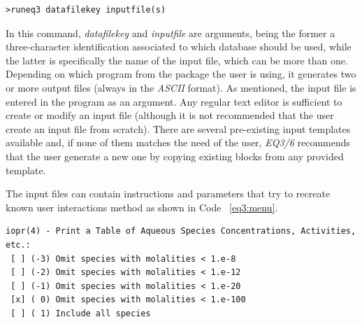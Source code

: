 \begin{lstlisting}[frame=single, caption=Running EQ3 in \emph{EQ3/6} package, label=eq3:run]
>runeq3 datafilekey inputfile(s)
\end{lstlisting}

In this command, \emph{datafilekey} and \emph{inputfile} are arguments, being the former a three-character identification associated to which database should be used, while the latter is specifically the name of the input file, which can be more than one. Depending on which program from the package the user is using, it generates two or more output files (always in the \emph{ASCII} format).
As mentioned, the input file is entered in the program as an argument. Any regular text editor is sufficient to create or modify an input file (although it is not recommended that the user create an input file from scratch). There are several pre-existing input templates available and, if none of them matches the need of the user, \emph{EQ3/6} recommends that the user generate a new one by copying existing blocks from any provided template.

The input files can contain instructions and parameters that try to recreate known user interactions method as shown in Code ~\ref{eq3:menu}.

\begin{minipage}[c]{0.92\textwidth}
\begin{lstlisting}[frame=single, caption=Menu Option inside \emph{EQ3/6} input files that mimics a "radio button", label=eq3:menu]
iopr(4) - Print a Table of Aqueous Species Concentrations, Activities, etc.: 
 [ ] (-3) Omit species with molalities < 1.e-8 
 [ ] (-2) Omit species with molalities < 1.e-12 
 [ ] (-1) Omit species with molalities < 1.e-20 
 [x] ( 0) Omit species with molalities < 1.e-100 
 [ ] ( 1) Include all species 
\end{lstlisting}
\end{minipage}

